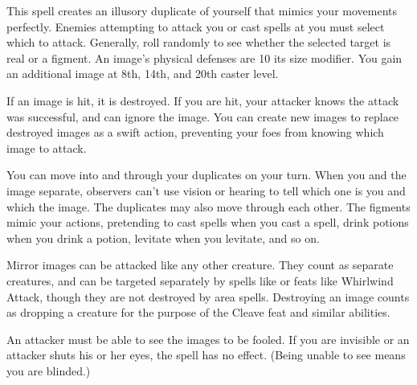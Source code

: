\spelldur{\durshort \dismissable}
\begin{spelleffect}
    This spell creates an illusory duplicate of yourself that mimics your movements perfectly. Enemies attempting to attack you or cast spells at you must select which to attack. Generally, roll randomly to see whether the selected target is real or a figment. An image's physical defenses are 10 \add its size modifier. You gain an additional image at 8th, 14th, and 20th caster level. 
    \par If an image is hit, it is destroyed. If you are hit, your attacker knows the attack was successful, and can ignore the image. You can create new images to replace destroyed images as a swift action, preventing your foes from knowing which image to attack.
    \par You can move into and through your duplicates on your turn. When you and the image separate, observers can't use vision or hearing to tell which one is you and which the image. The duplicates may also move through each other. The figments mimic your actions, pretending to cast spells when you cast a spell, drink potions when you drink a potion, levitate when you levitate, and so on.
    \par Mirror images can be attacked like any other creature. They count as separate creatures, and can be targeted separately by spells like  or feats like Whirlwind Attack, though they are not destroyed by area spells. Destroying an image counts as dropping a creature for the purpose of the Cleave feat and similar abilities.
\end{spelleffect}
\begin{spellnotes}
    An attacker must be able to see the images to be fooled. If you are invisible or an attacker shuts his or her eyes, the spell has no effect. (Being unable to see means you are blinded.)
\end{spellnotes}

